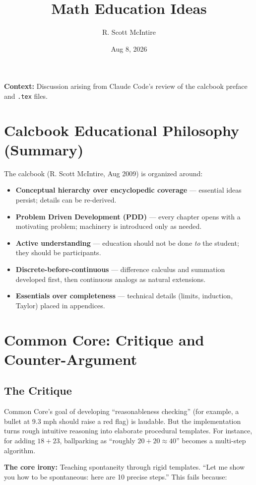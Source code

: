 \documentclass[11pt]{article}
\title{Math Education Ideas}
\date{Aug 8, 2026}
\author{R. Scott McIntire}
\begin{document}
\maketitle

\noindent\textbf{Context:} Discussion arising from Claude Code's review of the calcbook preface and \texttt{.tex} files.

\section{Calcbook Educational Philosophy (Summary)}

The calcbook (R. Scott McIntire, Aug 2009) is organized around:

\begin{itemize}
  \item \textbf{Conceptual hierarchy over encyclopedic coverage} --- essential ideas persist; details can be re-derived.
  \item \textbf{Problem Driven Development (PDD)} --- every chapter opens with a motivating problem; machinery is introduced only as needed.
  \item \textbf{Active understanding} --- education should not be done \emph{to} the student; they should be participants.
  \item \textbf{Discrete-before-continuous} --- difference calculus and summation developed first, then continuous analogs as natural extensions.
  \item \textbf{Essentials over completeness} --- technical details (limits, induction, Taylor) placed in appendices.
\end{itemize}

\section{Common Core: Critique and Counter-Argument}

\subsection{The Critique}

Common Core's goal of developing ``reasonableness checking'' (for example, a bullet at 9.3 mph should raise a red flag) is laudable. But the implementation turns rough intuitive reasoning into elaborate procedural templates. For instance, for adding $18 + 23$, ballparking as ``roughly $20 + 20 \approx 40$'' becomes a multi-step algorithm.

\textbf{The core irony:} Teaching spontaneity through rigid templates. ``Let me show you how to be spontaneous: here are 10 precise steps.'' This fails because:
\end{document}
